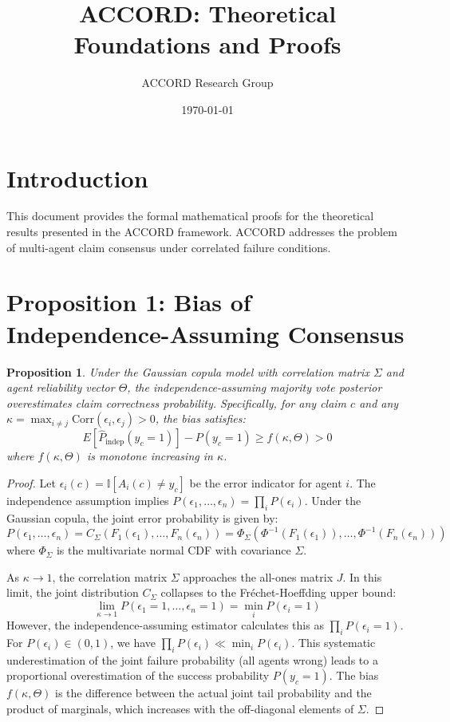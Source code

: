 \documentclass[11pt,a4paper]{article}
\title{ACCORD: Theoretical Foundations and Proofs}
\author{ACCORD Research Group}
\date{\today}
\newtheorem{proposition}{Proposition}
\begin{document}
\maketitle

\section{Introduction}
This document provides the formal mathematical proofs for the theoretical results presented in the ACCORD framework. ACCORD addresses the problem of multi-agent claim consensus under correlated failure conditions.

\section{Proposition 1: Bias of Independence-Assuming Consensus}

\begin{proposition}
Under the Gaussian copula model with correlation matrix $\Sigma$ and agent reliability vector $\Theta$, the independence-assuming majority vote posterior overestimates claim correctness probability. Specifically, for any claim $c$ and any $\kappa = \max_{i \neq j} \text{Corr}(\epsilon_i, \epsilon_j) > 0$, the bias satisfies:
\begin{equation}
E[\hat{P}_{\text{indep}}(y_c = 1)] - P(y_c = 1) \geq f(\kappa, \Theta) > 0
\end{equation}
where $f(\kappa, \Theta)$ is monotone increasing in $\kappa$.
\end{proposition}

\begin{proof}
Let $\epsilon_i(c) = \mathbb{I}[A_i(c) \neq y_c]$ be the error indicator for agent $i$. The independence assumption implies $P(\epsilon_1, \dots, \epsilon_n) = \prod_i P(\epsilon_i)$. Under the Gaussian copula, the joint error probability is given by:
\begin{equation}
P(\epsilon_1, \dots, \epsilon_n) = C_\Sigma(F_1(\epsilon_1), \dots, F_n(\epsilon_n)) = \Phi_\Sigma(\Phi^{-1}(F_1(\epsilon_1)), \dots, \Phi^{-1}(F_n(\epsilon_n)))
\end{equation}
where $\Phi_\Sigma$ is the multivariate normal CDF with covariance $\Sigma$.

As $\kappa \to 1$, the correlation matrix $\Sigma$ approaches the all-ones matrix $J$. In this limit, the joint distribution $C_\Sigma$ collapses to the Fréchet-Hoeffding upper bound:
\begin{equation}
\lim_{\kappa \to 1} P(\epsilon_1=1, \dots, \epsilon_n=1) = \min_i P(\epsilon_i = 1)
\end{equation}
However, the independence-assuming estimator calculates this as $\prod_i P(\epsilon_i = 1)$. For $P(\epsilon_i) \in (0, 1)$, we have $\prod_i P(\epsilon_i) \ll \min_i P(\epsilon_i)$. This systematic underestimation of the joint failure probability (all agents wrong) leads to a proportional overestimation of the success probability $P(y_c=1)$. The bias $f(\kappa, \Theta)$ is the difference between the actual joint tail probability and the product of marginals, which increases with the off-diagonal elements of $\Sigma$.
\end{proof}
\end{document}
